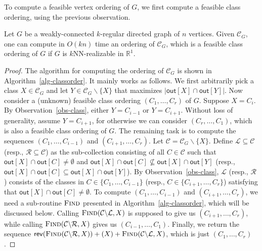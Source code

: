 To compute a feasible vertex ordering of $G$, we first compute a feasible class ordering, using the previous observation.
\begin{lemma} \label{lem-classorder}
    Let $G$ be a weakly-connected $k$-regular directed graph of $n$ vertices.
    Given $\mathcal{C}_G$, one can compute in $O(kn)$ time an ordering of $\mathcal{C}_G$, which is a feasible class ordering of $G$ if $G$ is $k$NN-realizable in $\mathbb{R}^1$.
\end{lemma}

\begin{proof}
The algorithm for computing the ordering of $\mathcal{C}_G$ is shown in Algorithm~\ref{alg-classorder}.
It mainly works as follows.
We first arbitrarily pick a class $X \in \mathcal{C}_G$ and let $Y \in \mathcal{C}_G \backslash \{X\}$ that maximizes $|\mathsf{out}[X] \cap \mathsf{out}[Y]|$.
Now consider a (unknown) feasible class ordering $(C_1,\dots,C_r)$ of $G$.
Suppose $X = C_i$.
By Observation~\ref{obs-class}, either $Y = C_{i-1}$ or $Y = C_{i+1}$.
Without loss of generality, assume $Y = C_{i+1}$, for otherwise we can consider $(C_r,\dots,C_1)$, which is also a feasible class ordering of $G$.
The remaining task is to compute the sequences $(C_1,\dots,C_{i-1})$ and $(C_{i+1},\dots,C_r)$.
Let $\mathcal{C} = \mathcal{C}_G \backslash \{X\}$.
Define $\mathcal{L} \subseteq \mathcal{C}$ (resp., $\mathcal{R} \subseteq \mathcal{C}$) as the sub-collection consisting of all $C \in \mathcal{C}$ such that $\mathsf{out}[X] \cap \mathsf{out}[C] \neq \emptyset$ and $\mathsf{out}[X] \cap \mathsf{out}[C] \nsubseteq \mathsf{out}[X] \cap \mathsf{out}[Y]$ (resp., $\mathsf{out}[X] \cap \mathsf{out}[C] \subseteq \mathsf{out}[X] \cap \mathsf{out}[Y]$).
By Observation~\ref{obs-class}, $\mathcal{L}$ (resp., $\mathcal{R}$) consists of the classes in $C \in \{C_1,\dots,C_{i-1}\}$ (resp., $C \in \{C_{i+1},\dots,C_r\}$) satisfying that $\mathsf{out}[X] \cap \mathsf{out}[C] \neq \emptyset$.
To compute $(C_1,\dots,C_{i-1})$ and $(C_{i+1},\dots,C_r)$, we need a sub-routine $\textsc{Find}$ presented in Algorithm~\ref{alg-classorder}, which will be discussed below.
Calling $\textsc{Find}(\mathcal{C} \backslash \mathcal{L},X)$ is supposed to give us $(C_{i+1},\dots,C_r)$, while calling $\textsc{Find}(\mathcal{C} \backslash \mathcal{R},X)$ gives us $(C_{i-1},\dots,C_1)$.
Finally, we return the sequence $\mathsf{rev}(\textsc{Find}(\mathcal{C} \backslash \mathcal{R},X)) + (X) + \textsc{Find}(\mathcal{C} \backslash \mathcal{L},X)$, which is just $(C_1,\dots,C_r)$.

\end{proof}
